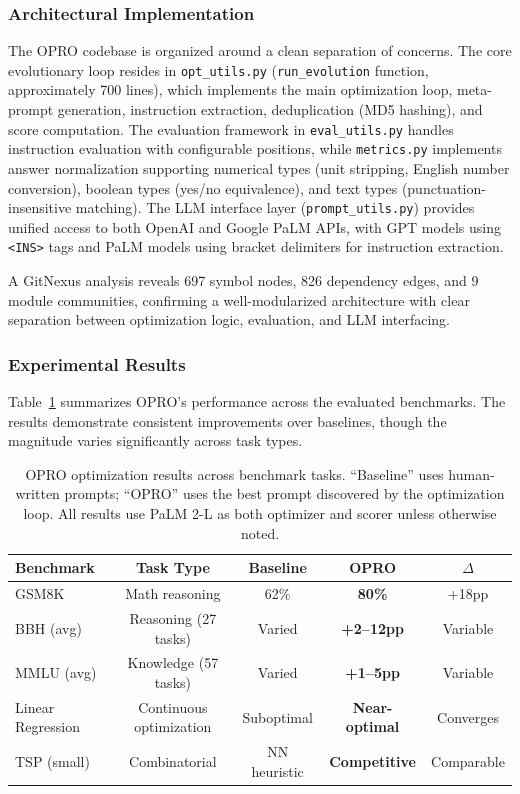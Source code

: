 \subsubsection{Architectural Implementation}

The OPRO codebase is organized around a clean separation of concerns. The core evolutionary loop resides in \texttt{opt\_utils.py} (\texttt{run\_evolution} function, approximately 700 lines), which implements the main optimization loop, meta-prompt generation, instruction extraction, deduplication (MD5 hashing), and score computation. The evaluation framework in \texttt{eval\_utils.py} handles instruction evaluation with configurable positions, while \texttt{metrics.py} implements answer normalization supporting numerical types (unit stripping, English number conversion), boolean types (yes/no equivalence), and text types (punctuation-insensitive matching). The LLM interface layer (\texttt{prompt\_utils.py}) provides unified access to both OpenAI and Google PaLM APIs, with GPT models using \texttt{<INS>} tags and PaLM models using bracket delimiters for instruction extraction.

A GitNexus analysis reveals 697 symbol nodes, 826 dependency edges, and 9 module communities, confirming a well-modularized architecture with clear separation between optimization logic, evaluation, and LLM interfacing.

\subsubsection{Experimental Results}

Table~\ref{tab:opro-results} summarizes OPRO's performance across the evaluated benchmarks. The results demonstrate consistent improvements over baselines, though the magnitude varies significantly across task types.

\begin{table}[t]
\centering
\caption{OPRO optimization results across benchmark tasks. ``Baseline'' uses human-written prompts; ``OPRO'' uses the best prompt discovered by the optimization loop. All results use PaLM 2-L as both optimizer and scorer unless otherwise noted.}
\label{tab:opro-results}
\small
\begin{tabular}{@{}lcccc@{}}
\toprule
\textbf{Benchmark} & \textbf{Task Type} & \textbf{Baseline} & \textbf{OPRO} & \textbf{$\Delta$} \\
\midrule
GSM8K & Math reasoning & 62\% & \textbf{80\%} & +18pp \\
BBH (avg) & Reasoning (27 tasks) & Varied & \textbf{+2--12pp} & Variable \\
MMLU (avg) & Knowledge (57 tasks) & Varied & \textbf{+1--5pp} & Variable \\
Linear Regression & Continuous optimization & Suboptimal & \textbf{Near-optimal} & Converges \\
TSP (small) & Combinatorial & NN heuristic & \textbf{Competitive} & Comparable \\
\bottomrule
\end{tabular}
\end{table}

